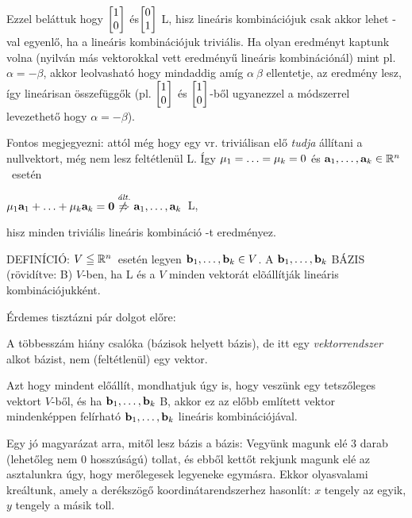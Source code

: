 \documentclass[a4paper,11.5pt]{article}
\begin{document}
	\noindent Ezzel beláttuk hogy
	$\begin{bmatrix}
		1\s\\
		0\s \\
	\end{bmatrix}$ és$
	\begin{bmatrix}
		0\s\\
		1\s \\
	\end{bmatrix}$ L, hisz lineáris kombinációjuk csak akkor lehet \0-val egyenlő, ha a lineáris kombinációjuk triviális. Ha olyan eredményt kaptunk volna (nyilván más vektorokkal vett \0 eredményű lineáris kombinációnál) mint pl. $\alpha=-\beta$, akkor leolvasható hogy mindaddig amíg $\alpha~\beta$ ellentetje, az eredmény \0 lesz, így lineárisan összefüggők (pl. 
	$\begin{bmatrix}
		1\s\\
		0\s \\
	\end{bmatrix}$ és 
	$\begin{bmatrix}
	1\s\\
	0\s \\
	\end{bmatrix}$-ből ugyanezzel a módszerrel levezethető hogy $\alpha=-\beta$).
	
	Fontos megjegyezni: attól még hogy egy vr. triviálisan elő \emph{tudja} állítani a nullvektort, még nem lesz feltétlenül L. Így $\mu_1=\ldots=\mu_k=0$ és $\textbf{a}_1,\ldots, \textbf{a}_k \in \mathbb{R}^{n}$~esetén  \begin{center}
		$\mu_1\textbf{a}_1+\ldots+\mu_k\textbf{a}_k=\textbf{0} \stackrel{\text{\textit{ált.}}}{\not\Rightarrow}\textbf{a}_1,\ldots, \textbf{a}_k $~L,
	\end{center}
	\noindent hisz minden triviális lineáris kombináció \0-t eredményez.
	
	DEFINÍCIÓ: $V\leqq\mathbb{R}^{n}$~esetén legyen $\textbf{b} _1, \dots, \textbf{b} _k \in
	V$. A $\textbf{b}
	_1, \dots, \textbf{b} _k$ BÁZIS (rövidítve: B) $V$-ben, ha L és a $V$
	minden vektorát elõállítják lineáris kombinációjukként.  
	\medskip
	
	\noindent Érdemes tisztázni pár dolgot előre:
	\begin{compactitem}
		\item A többesszám hiány csalóka (bázisok helyett bázis), de itt egy \emph{vektorrendszer} alkot bázist, nem (feltétlenül) egy vektor.
		\item Azt hogy mindent előállít, mondhatjuk úgy is, hogy veszünk egy tetszőleges vektort $V$-ből, és ha $\textbf{b} _1, \dots, \textbf{b} _k$ B, akkor ez az előbb említett vektor mindenképpen felírható $\textbf{b} _1, \dots, \textbf{b} _k$ lineáris kombinációjával.
	\end{compactitem}
	Egy jó magyarázat arra, mitől lesz bázis a bázis: Vegyünk magunk elé 3 darab (lehetőleg nem 0 hosszúságú) tollat, és ebből kettőt rekjunk magunk elé az asztalunkra úgy, hogy merőlegesek legyeneke egymásra. Ekkor olyasvalami kreáltunk, amely a derékszögő koordinátarendszerhez hasonlít: $x$ tengely az egyik, $y$ tengely a másik toll.
	
\end{document}
